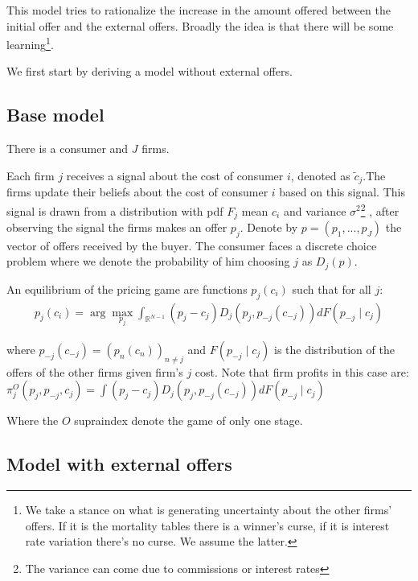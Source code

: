\documentclass[12pt]{article}
\begin{document}
This model tries to rationalize the increase in the amount offered between the initial offer and the external offers. Broadly the idea is that there will be some learning\footnote{We take a stance on what is generating uncertainty about the other firms' offers. If it is the mortality tables there is a winner's curse, if it is interest rate variation there's no curse. We assume the latter. }. 

We first start by deriving a model without external offers. 

\subsection{Base model }
There is a consumer and $J$ firms. 

Each firm $j$ receives a signal about the cost of consumer $i$, denoted as $\tilde{c}_{j}$.The firms update their beliefs about the cost of consumer $i$ based on this signal.
This signal is drawn from a distribution with pdf $F_j$ mean $c_i$ and variance $\sigma^2$\footnote{The variance can come due to commissions or interest rates} , after observing the signal the firms makes an offer $p_j$.  Denote by $p = (p_1, ..., p_J)$ the vector of offers received by the buyer.  The consumer faces a discrete choice problem where we denote the probability of him choosing $j$ as $D_j(p)$. 

An equilibrium of the pricing game are functions $p_j(c_i)$ such that for all $j$:
\begin{align}
\label{eq:base_equilibrium}
    p_j(c_i) = \arg \max_{p_j} \int_{\mathbb{R}^{N-1}}^{} (p_j - c_j) D_j(p_j, p_{-j}(c_{-j})) dF(p_{-j} \mid c_j)
\end{align} 

where $p_{-j}(c_{-j}) = (p_n(c_n))_{n \neq j}$ and $F(p_{-j} \mid c_j)$ is the distribution of the offers of the other firms given firm's $j$ cost. Note that firm profits in this case are: $\pi_j^{O}(p_j, p_{-j}, c_j) = \int (p_j - c_j) D_j(p_j, p_{-j}(c_{-j})) dF(p_{-j} \mid c_j)$

Where the $O$ supraindex denote the game of only one stage. 

\subsection{Model with external offers}
\end{document}
